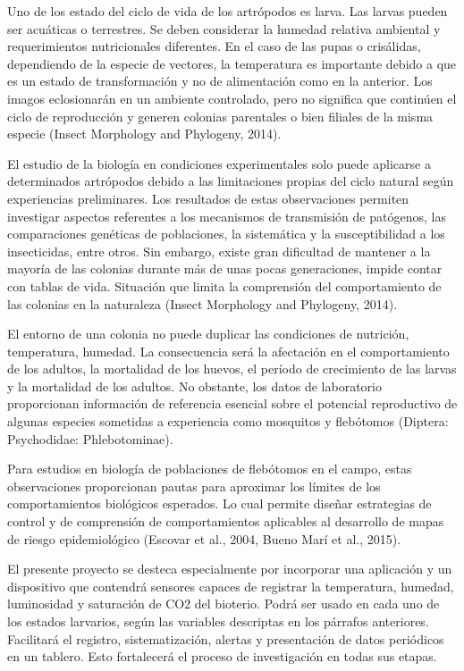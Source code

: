 \documentclass[
11pt, %
]{charter}
\begin{document}
Uno de los estado del ciclo de vida de los artrópodos es larva. Las larvas pueden ser acuáticas o terrestres. Se deben considerar la humedad relativa ambiental y requerimientos nutricionales diferentes. En el caso de las pupas o crisálidas, dependiendo de la especie de vectores, la temperatura es importante debido a que es un estado de transformación y no de alimentación como en la anterior. Los imagos eclosionarán en un ambiente controlado, pero no significa que continúen el ciclo de reproducción y generen colonias parentales o bien filiales de la misma especie (Insect Morphology and Phylogeny, 2014).

El estudio de la biología en condiciones experimentales solo puede aplicarse a determinados artrópodos debido a las limitaciones propias del ciclo natural según experiencias preliminares.  Los resultados de estas observaciones permiten investigar aspectos referentes a los mecanismos de transmisión de patógenos, las comparaciones genéticas de poblaciones, la sistemática y la susceptibilidad a los insecticidas, entre otros. Sin embargo, existe gran dificultad de mantener a la mayoría de las colonias durante más de unas pocas generaciones, impide contar con tablas de vida. Situación que limita la comprensión del comportamiento de las colonias en la naturaleza (Insect Morphology and Phylogeny, 2014).

El entorno de una colonia no puede duplicar las condiciones de nutrición, temperatura, humedad. La consecuencia será la afectación en el comportamiento de los adultos, la mortalidad de los huevos, el período de crecimiento de las larvas y la mortalidad de los adultos. No obstante, los datos de laboratorio proporcionan información de referencia esencial sobre el potencial reproductivo de algunas especies sometidas a experiencia como mosquitos y flebótomos (Diptera: Psychodidae: Phlebotominae). 

Para estudios en biología de poblaciones de flebótomos en el campo, estas observaciones proporcionan pautas para aproximar los límites de los comportamientos biológicos esperados. Lo cual permite diseñar estrategias de control y de comprensión de comportamientos aplicables al desarrollo de mapas de riesgo epidemiológico (Escovar et al., 2004, Bueno Marí et al., 2015).


El presente proyecto se desteca especialmente por incorporar una aplicación y un dispositivo que contendrá sensores capaces de registrar la temperatura, humedad, luminosidad y saturación de CO2 del bioterio. Podrá ser usado en cada uno de los estados larvarios, según las variables descriptas en los párrafos anteriores. Facilitará el registro, sistematización, alertas y presentación de datos periódicos en un tablero. Esto fortalecerá el proceso de investigación en todas sus etapas.
\end{document}
